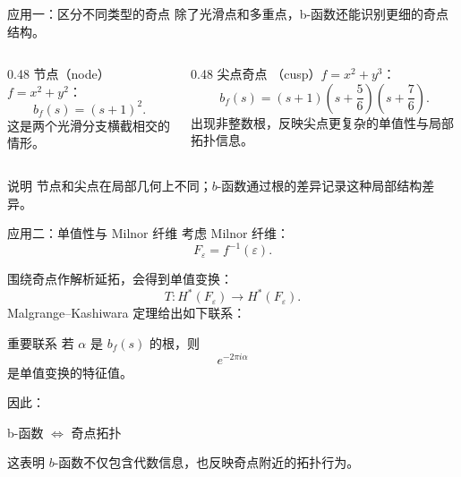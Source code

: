 \documentclass[aspectratio=169,11pt]{ctexbeamer}
\begin{document}
\begin{frame}{应用一：区分不同类型的奇点}
    除了光滑点和多重点，b-函数还能识别更细的奇点结构。
    \pause
    \begin{columns}[T]
        \begin{column}{0.48\textwidth}
            节点（node） $f=x^2+y^2$：
            \[
                b_f(s)=(s+1)^2.
            \]
            这是两个光滑分支横截相交的情形。
        \end{column}
        \pause
        \begin{column}{0.48\textwidth}
            尖点奇点 （cusp）$f=x^2+y^3$：
            \[
                b_f(s)=(s+1)\left(s+\frac56\right)\left(s+\frac76\right).
            \]
            出现非整数根，反映尖点更复杂的单值性与局部拓扑信息。
        \end{column}
    \end{columns}
    \pause
    \vspace{0.8em}
    \begin{block}{说明}
        节点和尖点在局部几何上不同；$b$-函数通过根的差异记录这种局部结构差异。
    \end{block}

\end{frame}





\begin{frame}{应用二：单值性与 Milnor 纤维}
    考虑 Milnor 纤维：
    \[
        F_\varepsilon=f^{-1}(\varepsilon).
    \]

    围绕奇点作解析延拓，会得到单值变换：
    \[
        T:H^*(F_\varepsilon)\to H^*(F_\varepsilon).
    \]
    \pause
    Malgrange--Kashiwara 定理给出如下联系：

    \begin{block}{重要联系}
        若 $\alpha$ 是 $b_f(s)$ 的根，则
        \[
            e^{-2\pi i\alpha}
        \]
        是单值变换的特征值。
    \end{block}

    因此：

    \begin{center}
        \Large
        b-函数 $\Longleftrightarrow$ 奇点拓扑
    \end{center}

    这表明 $b$-函数不仅包含代数信息，也反映奇点附近的拓扑行为。
\end{frame}
\end{document}

